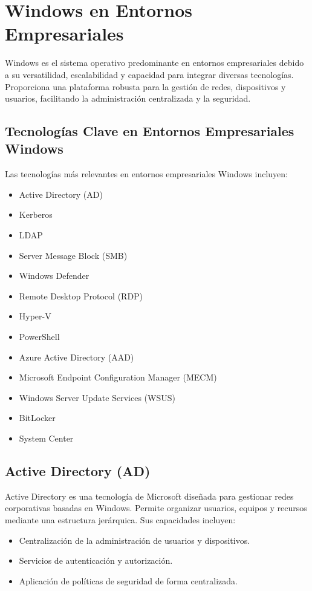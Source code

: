\section{Windows en Entornos Empresariales}

Windows es el sistema operativo predominante en entornos empresariales debido a
su versatilidad, escalabilidad y capacidad para integrar diversas tecnologías.
Proporciona una plataforma robusta para la gestión de redes, dispositivos y
usuarios, facilitando la administración centralizada y la seguridad.

\subsection{Tecnologías Clave en Entornos Empresariales Windows}

Las tecnologías más relevantes en entornos empresariales Windows incluyen:
\begin{itemize}
    \item Active Directory (AD)
    \item Kerberos
    \item LDAP
    \item Server Message Block (SMB)
    \item Windows Defender
    \item Remote Desktop Protocol (RDP)
    \item Hyper-V
    \item PowerShell
    \item Azure Active Directory (AAD)
    \item Microsoft Endpoint Configuration Manager (MECM)
    \item Windows Server Update Services (WSUS)
    \item BitLocker
    \item System Center
\end{itemize}

\subsection{Active Directory (AD)}

Active Directory es una tecnología de Microsoft diseñada para gestionar redes
corporativas basadas en Windows. Permite organizar usuarios, equipos y recursos
mediante una estructura jerárquica. Sus capacidades incluyen:
\begin{itemize}
    \item Centralización de la administración de usuarios y dispositivos.
    \item Servicios de autenticación y autorización.
    \item Aplicación de políticas de seguridad de forma centralizada.
\end{itemize}

